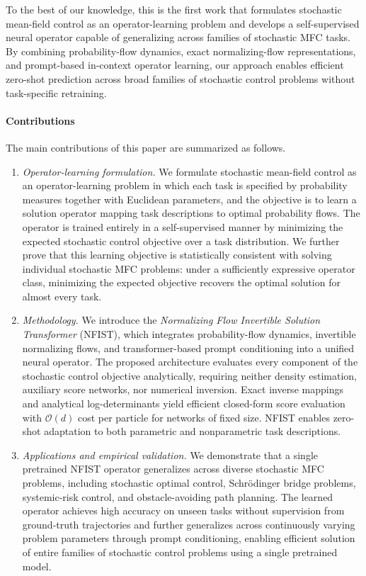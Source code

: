 \documentclass[preprint]{elsarticle}
\begin{document}
To the best of our knowledge, this is the first work that formulates stochastic mean-field control as an operator-learning problem and develops a self-supervised neural operator capable of generalizing across families of stochastic MFC tasks. By combining probability-flow dynamics, exact normalizing-flow representations, and prompt-based in-context operator learning, our approach enables efficient zero-shot prediction across broad families of stochastic control problems without task-specific retraining.

\paragraph{Contributions} The main contributions of this paper are summarized as follows.

\begin{enumerate}
    \item \emph{Operator-learning formulation.} We formulate stochastic mean-field control as an operator-learning problem in which each task is specified by probability measures together with Euclidean parameters, and the objective is to learn a solution operator mapping task descriptions to optimal probability flows. The operator is trained entirely in a self-supervised manner by minimizing the expected stochastic control objective over a task distribution. We further prove that this learning objective is statistically consistent with solving individual stochastic MFC problems: under a sufficiently expressive operator class, minimizing the expected objective recovers the optimal solution for almost every task.

    \item \emph{Methodology.} We introduce the \emph{Normalizing Flow Invertible Solution Transformer} (NFIST), which integrates probability-flow dynamics, invertible normalizing flows, and transformer-based prompt conditioning into a unified neural operator. The proposed architecture evaluates every component of the stochastic control objective analytically, requiring neither density estimation, auxiliary score networks, nor numerical inversion. Exact inverse mappings and analytical log-determinants yield efficient   closed-form score evaluation with $\mathcal{O}(d)$ cost per particle for networks of fixed size. NFIST enables zero-shot adaptation to both parametric and nonparametric task descriptions.
    
    \item \emph{Applications and empirical validation.} We demonstrate that a single pretrained NFIST operator generalizes across diverse stochastic MFC problems, including stochastic optimal control, Schr\"odinger bridge problems, systemic-risk control, and obstacle-avoiding path planning. The learned operator achieves high accuracy on unseen tasks without supervision from ground-truth trajectories and further generalizes across continuously varying problem parameters through prompt conditioning, enabling efficient solution of entire families of stochastic control problems using a single pretrained model.
\end{enumerate}
\end{document}
